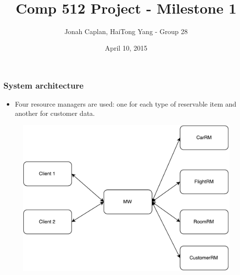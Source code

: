 \documentclass[10pt]{beamer}
\title[Comp 512 Project - Milestone 1]{Comp 512 Project - Milestone 1} %
\author{Jonah Caplan, HaiTong Yang - Group 28} %
\institute %
{
McGill University \\ %
\medskip
\textit{jonah.caplan@mail.mcgill.ca,hai.yang@mail.mcgill.ca} %
}
\date{April 10, 2015} %
\begin{document}
\begin{frame}
\titlepage %
\end{frame}


\begin{frame}
\frametitle{System architecture}
\begin{itemize}
  \item Four resource managers are used: one for each type of reservable item and another for customer data.
\end{itemize}
\begin{figure}
\centering
\includegraphics[scale=0.4]{figures/arch.pdf}
\end{figure}
\end{frame}
\end{document}
